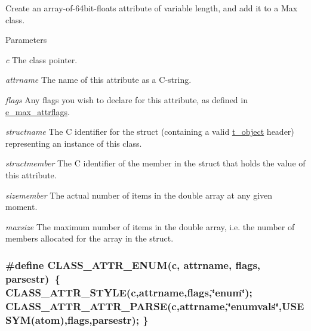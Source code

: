 Create an array-\/of-\/64bit-\/floats attribute of variable length, and add it to a Max class. 
\begin{DoxyParams}{Parameters}
\item[{\em c}]The class pointer. \item[{\em attrname}]The name of this attribute as a C-\/string. \item[{\em flags}]Any flags you wish to declare for this attribute, as defined in \hyperlink{group__attr_gaf296cfc6741bb19207f6ed8062809115}{e\_\-max\_\-attrflags}. \item[{\em structname}]The C identifier for the struct (containing a valid \hyperlink{structt__object}{t\_\-object} header) representing an instance of this class. \item[{\em structmember}]The C identifier of the member in the struct that holds the value of this attribute. \item[{\em sizemember}]The actual number of items in the double array at any given moment. \item[{\em maxsize}]The maximum number of items in the double array, i.e. the number of members allocated for the array in the struct. \end{DoxyParams}
\hypertarget{group__attr_gaababb47839dc4396bddfbf8149214e21}{
\subsubsection[{CLASS\_\-ATTR\_\-ENUM}]{\setlength{\rightskip}{0pt plus 5cm}\#define CLASS\_\-ATTR\_\-ENUM(c, \/  attrname, \/  flags, \/  parsestr)~\{ CLASS\_\-ATTR\_\-STYLE(c,attrname,flags,\char`\"{}enum\char`\"{}); CLASS\_\-ATTR\_\-ATTR\_\-PARSE(c,attrname,\char`\"{}enumvals\char`\"{},USESYM(atom),flags,parsestr); \}}}
\label{group__attr_gaababb47839dc4396bddfbf8149214e21}


